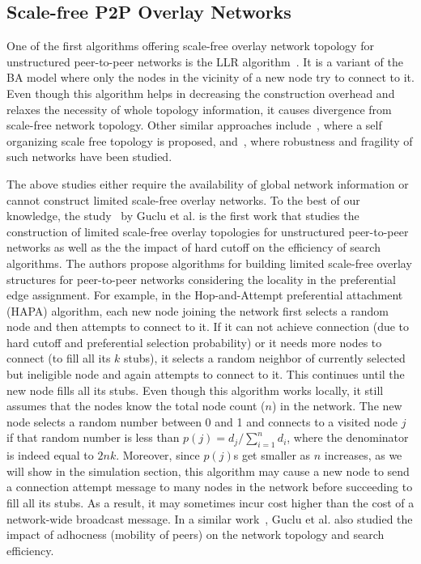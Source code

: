\documentclass[10pt,journal,cspaper,compsoc]{IEEEtran}
\begin{document}
\subsection{Scale-free P2P Overlay Networks}

One of the first algorithms offering scale-free overlay network topology for unstructured peer-to-peer networks is the LLR algorithm~\cite{llr}. It is a variant of the BA model where only the nodes in the vicinity of a new node try to connect to it. Even though this algorithm helps in decreasing the construction overhead and relaxes the necessity of whole topology information, it causes divergence from scale-free network topology. Other similar approaches include~\cite{self}, where a self organizing scale free topology is proposed, and~\cite{overlay}, where robustness and fragility of such networks have been studied.

The above studies either require the availability of global network information or cannot construct limited scale-free overlay networks. To the best of our knowledge, the study~\cite{guclu} by Guclu et al. is the first work that studies the construction of limited scale-free overlay topologies for unstructured peer-to-peer networks as well as the the impact of hard cutoff on the  efficiency of search algorithms. The authors propose algorithms for building limited scale-free overlay structures for peer-to-peer networks considering the locality in the preferential edge assignment. For example, in the Hop-and-Attempt preferential attachment (HAPA) algorithm, each new node joining the network first selects a random node and then attempts to connect to it. If it can not achieve connection (due to hard cutoff and preferential selection probability) or it needs more nodes to connect (to fill all its $k$ stubs), it selects a random neighbor of currently selected but ineligible node and again attempts to connect to it. This continues until the new node fills all its stubs. Even though this algorithm works locally, it still assumes that the nodes know the total node count ($n$) in the network. The new node selects a random number between 0 and 1 and connects to a visited node $j$ if that random number is less than $p(j) = d_j/\sum_{i=1}^{n}d_i$, where the denominator is indeed equal to $2nk$. Moreover, since $p(j)$s get smaller as $n$ increases, as we will show in the simulation section, this algorithm may cause a new node to send a connection attempt message to many nodes in the network before succeeding to fill all its stubs. As a result, it may sometimes incur cost higher than the cost of a network-wide broadcast message. In a similar work~\cite{adhoc}, Guclu et al. also studied the impact of adhocness (mobility of peers) on the network topology and search efficiency.
\end{document}
